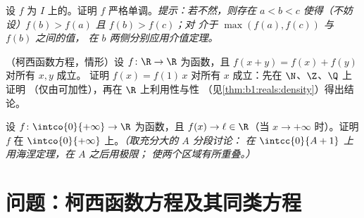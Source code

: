 \begin{exercise}[$\star\star\star$]\label{exo:b1:continuity:10}
设 $f$ 为 $I$ 上的。证明
$f$ 严格单调。\emph{提示：若不然，则存在 $a < b < c$
使得（不妨设）$f(b) > f(a)$ 且 $f(b) > f(c)$；对
介于 $\max(f(a), f(c))$ 与 $f(b)$ 之间的值，
在 $b$ 两侧分别应用介值定理。}
\end{exercise}

\begin{exercise}[$\star\star\star$]\label{exo:b1:continuity:11}
（柯西函数方程，情形）设 $f \colon \R \to
\R$ 为函数，且 $f(x + y) = f(x) + f(y)$ 对所有 $x, y$ 成立。
证明 $f(x) = f(1)\,x$ 对所有 $x$ 成立：先在 $\N$、$\Z$、$\Q$ 上证明
（仅由可加性），再在 $\R$ 上利用性与性
（见\cref{thm:b1:reals:density}）得出结论。
\end{exercise}

\begin{exercise}[$\star\star\star$]\label{exo:b1:continuity:12}
设 $f \colon \intco{0}{+\infty} \to \R$ 为函数，且
$f(x) \to \ell \in \R$（当 $x \to +\infty$ 时）。证明 $f$ 在
$\intco{0}{+\infty}$ 上\emph{}。\emph{（取充分大的 $A$ 分段讨论：
在 $\intcc{0}{A+1}$ 上用海涅定理，在 $A$ 之后用极限；
使两个区域有所重叠。）}
\end{exercise}

\section{问题：柯西函数方程及其同类方程}

